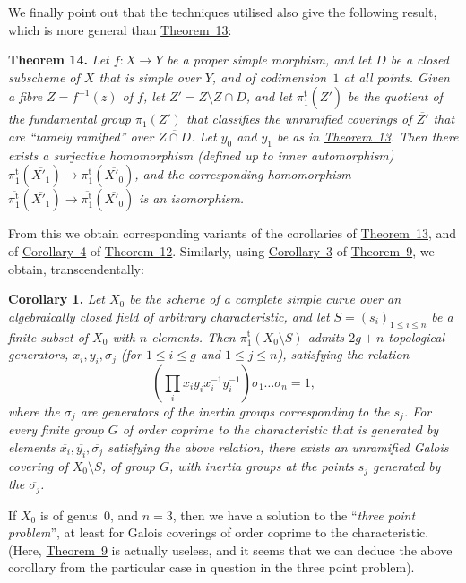 \documentclass{article}
\newenvironment{itenv}[1]
  {\phantomsection\par\medskip\noindent\textbf{#1.}\itshape}
  {\medskip}
\renewcommand{\leq}{\leqslant}
\newcommand{\oldpage}[1]{\marginpar{\footnotesize$\Big\vert$ \textit{p.~#1}}}
\begin{document}
We finally point out that the techniques utilised also give the following result, which is more general than \hyperref[theorem13]{Theorem~13}:

\begin{itenv}{Theorem 14}
\label{theorem14}
  Let $f\colon X\to Y$ be a proper simple morphism, and let $D$ be a closed subscheme of $X$ that is simple over $Y$, and of codimension~$1$ at all points.
  Given a fibre $Z=f^{-1}(z)$ of $f$, let $Z'=Z\setminus Z\cap D$, and let $\pi_1^\mathrm{t}(\overline{Z'})$ be the quotient of the fundamental group $\pi_1(Z')$ that classifies the unramified coverings of $\overline{Z'}$ that are ``tamely ramified'' over $\overline{Z\cap D}$.
  Let $y_0$ and $y_1$ be as in \hyperref[theorem13]{Theorem~13}.
  Then there exists a \emph{surjective} homomorphism (defined up to inner automorphism) $\pi_1^\mathrm{t}(\overline{X'_1})\to\pi_1^\mathrm{t}(\overline{X'_0})$, and the corresponding homomorphism $\overline{\pi_1^\mathrm{t}}(\overline{X'_1})\to\overline{\pi_1^\mathrm{t}}(\overline{X'_0})$ is an isomorphism.
\end{itenv}

From this we obtain corresponding variants of the corollaries of \hyperref[theorem13]{Theorem~13}, and of \hyperref[theorem12corollary4]{Corollary~4} of \hyperref[theorem12]{Theorem~12}.
Similarly, using \hyperref[theorem9corollary3]{Corollary~3} of \hyperref[theorem9]{Theorem~9}, we obtain, transcendentally:

\begin{itenv}{Corollary 1}
\label{theorem14corollary1}
  Let $X_0$ be the scheme of a complete simple curve over an algebraically closed field of arbitrary characteristic, and let $S=(s_i)_{1\leq i\leq n}$ be a finite subset of $X_0$ with $n$ elements.
  Then $\pi_1^\mathrm{t}(X_0\setminus S)$ admits $2g+n$ topological generators, $x_i,y_i,\sigma_j$ (for $1\leq i\leq g$ and $1\leq j\leq n$), satisfying the relation
  \[
    \left(\prod_i x_iy_ix_i^{-1}y_i^{-1}\right)\sigma_1\ldots\sigma_n = 1,
  \]
  where the $\sigma_j$ are generators of the inertia groups corresponding to the $s_j$.
  For every finite group $G$ \emph{of order coprime to the characteristic} that is generated by elements $\overline{x_i},\overline{y_i},\overline{\sigma_j}$ satisfying the above relation, there exists an unramified Galois covering of $X_0\setminus S$, of group $G$, with inertia groups at the points $s_j$ generated by the $\overline{\sigma_j}$.
\end{itenv}

If $X_0$ is of genus~$0$, and $n=3$, then we have a solution to the
\oldpage{182-28}
``\emph{three point problem}'', at least for Galois coverings of order coprime to the characteristic.
(Here, \hyperref[theorem9]{Theorem~9} is actually useless, and it seems that we can deduce the above corollary from the particular case in question in the three point problem).
\end{document}
